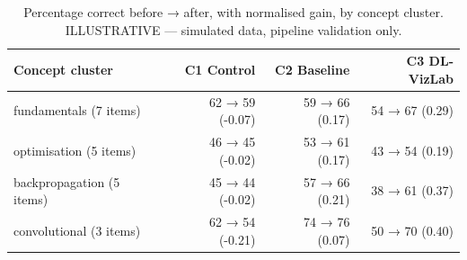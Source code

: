 \begin{table}[htbp]
\centering
\small
\caption{Percentage correct before → after, with normalised gain, by concept cluster. ILLUSTRATIVE — simulated data, pipeline validation only.}
\label{tab:T09}
\begin{tabular}{lrrr}
\toprule
Concept cluster & C1 Control & C2 Baseline & C3 DL-VizLab \\
\midrule
fundamentals (7 items) & 62 → 59 (-0.07) & 59 → 66 (0.17) & 54 → 67 (0.29) \\
optimisation (5 items) & 46 → 45 (-0.02) & 53 → 61 (0.17) & 43 → 54 (0.19) \\
backpropagation (5 items) & 45 → 44 (-0.02) & 57 → 66 (0.21) & 38 → 61 (0.37) \\
convolutional (3 items) & 62 → 54 (-0.21) & 74 → 76 (0.07) & 50 → 70 (0.40) \\
\bottomrule
\end{tabular}
\end{table}
